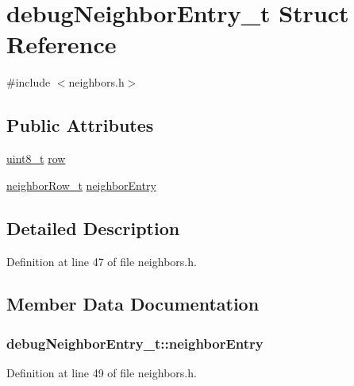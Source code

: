 \hypertarget{structdebug_neighbor_entry__t}{}\section{debug\+Neighbor\+Entry\+\_\+t Struct Reference}
\label{structdebug_neighbor_entry__t}


{\ttfamily \#include $<$neighbors.\+h$>$}

\subsection*{Public Attributes}
\begin{DoxyCompactItemize}
\item 
\hyperlink{_p_e___types_8h_aba7bc1797add20fe3efdf37ced1182c5}{uint8\+\_\+t} \hyperlink{structdebug_neighbor_entry__t_ab393c4e54604336bb6f9d4da65aabf62}{row}
\item 
\hyperlink{structneighbor_row__t}{neighbor\+Row\+\_\+t} \hyperlink{structdebug_neighbor_entry__t_af6bfb8ef15959f394554e668c823138f}{neighbor\+Entry}
\end{DoxyCompactItemize}


\subsection{Detailed Description}


Definition at line 47 of file neighbors.\+h.



\subsection{Member Data Documentation}
\subsubsection[{\texorpdfstring{neighbor\+Entry}{neighborEntry}}]{ debug\+Neighbor\+Entry\+\_\+t\+::neighbor\+Entry}\hypertarget{structdebug_neighbor_entry__t_af6bfb8ef15959f394554e668c823138f}{}\label{structdebug_neighbor_entry__t_af6bfb8ef15959f394554e668c823138f}


Definition at line 49 of file neighbors.\+h.

